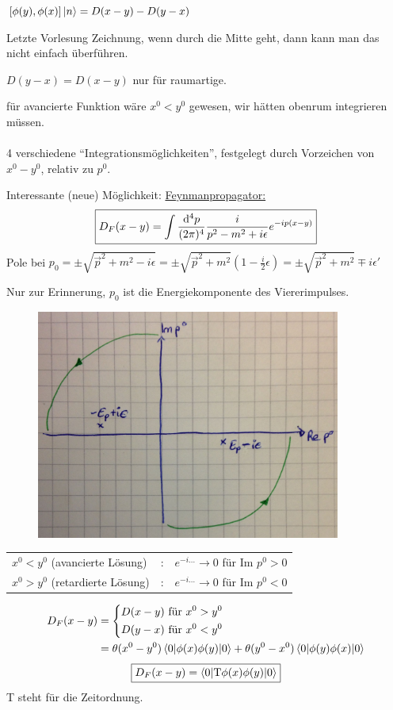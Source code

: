 $[\phi(y), \phi(x)] \ket{n} = D(x- y) - D(y -x)$ 

Letzte Vorlesung Zeichnung, wenn durch die Mitte geht, dann kann man das nicht einfach überführen. 

$D(y -x) = D(x -y)$ nur für raumartige.

für avancierte Funktion wäre $x^0 < y^0$ gewesen, wir hätten obenrum integrieren müssen. 
\\ \\
4 verschiedene ``Integrationsmöglichkeiten'', festgelegt durch Vorzeichen von $x^0 - y^0$, relativ zu $p^0$.

Interessante (neue) Möglichkeit: \underline{Feynmanpropagator:}
	\begin{align*}
		\boxed{D_F(x -y) = \int \frac{\mathrm{d}^4 p}{(2 \pi)^4} \frac{i}{p^2 -m^2 + i\epsilon} e^{-ip(x-y)} }
	\end{align*}
Pole bei $p_0 = \pm \sqrt{\vec{p}^2 + m^2 - i\epsilon} = \pm \sqrt{\vec{p}^2 + m^2}\left(1 -\frac{i}{2} \epsilon\right) = \pm \sqrt{\vec{p}^2 + m^2} \mp i \epsilon'$

Nur zur Erinnerung, $p_0$ ist die Energiekomponente des Viererimpulses.

	\begin{figure} [h]
		\begin{center}
			\includegraphics[width = 10cm]{Klein-Gordon-Propagator2}
		\end{center}	
	\end{figure}

	\begin{tabular}{l l l}
		$x^0 < y^0$ (avancierte Lösung) &:& $e^{-i \ldots} \rightarrow 0$ für Im $p^0>0$\\
		$x^0 > y^0$ (retardierte Lösung) &:& $e^{-i \ldots} \rightarrow 0$ für Im $p^0 <0$
 	\end{tabular}
 	\begin{align*}
	 	D_F(x-y) &=
	 	\left\{
	 	\begin{aligned}
		 	D(x-y) &\text{ für } x^0 > y^0 \\
		 	D(y-x) &\text{ für } x^0 < y^0 
	 	\end{aligned}
	 	\right. \\
	 	&= \theta (x^0- y^0) \braket{0 | \phi (x) \phi(y) | 0} + 
	 	\theta(y^0 -x^0) \braket{0 | \phi (y) \phi(x) | 0}
 	\end{align*}
 	\begin{align*}
	 	\boxed{D_F(x-y) = \braket{0 | \mathrm{T}\phi (x) \phi(y) | 0}}
 	\end{align*}
 T steht für die Zeitordnung.
 
